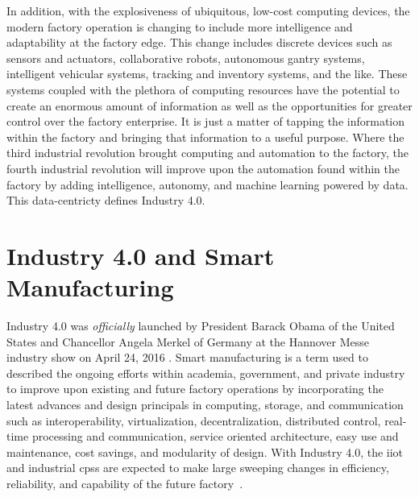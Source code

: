 In addition, with the explosiveness of ubiquitous, low-cost computing devices, the modern factory operation is changing to include more intelligence and adaptability at the factory edge.  This change includes discrete devices such as sensors and actuators, collaborative robots, autonomous gantry systems, intelligent vehicular systems, tracking and inventory systems, and the like.  These systems coupled with the plethora of computing resources have the potential to create an enormous amount of information as well as the opportunities for greater control over the factory enterprise.  It is just a matter of tapping the information within the factory and bringing that information to a useful purpose.  Where the third industrial revolution brought computing and automation to the factory, the fourth industrial revolution will improve upon the automation found within the factory by adding intelligence, autonomy, and machine learning powered by data. This data-centricty defines Industry 4.0.  

\section{Industry 4.0 and Smart Manufacturing}

Industry 4.0 was \textit{officially} launched by President Barack Obama of the United States and Chancellor Angela Merkel of Germany at the Hannover Messe industry show on April 24, 2016 \cite{HannoverMesse2016:Report, HannoverMesse2016:MachineDesign}.  Smart manufacturing is a term used to described the ongoing efforts within academia, government, and private industry to improve upon existing and future factory operations by incorporating the latest advances and design principals in computing, storage, and communication such as interoperability, virtualization, decentralization, distributed control, real-time processing and communication, service oriented architecture, easy use and maintenance, cost savings, and modularity of design.  With Industry 4.0, the \gls{iiot} and industrial \glspl{cps} are expected to make large sweeping changes in efficiency, reliability, and capability of the future factory~\cite{Raptis2019}.	

